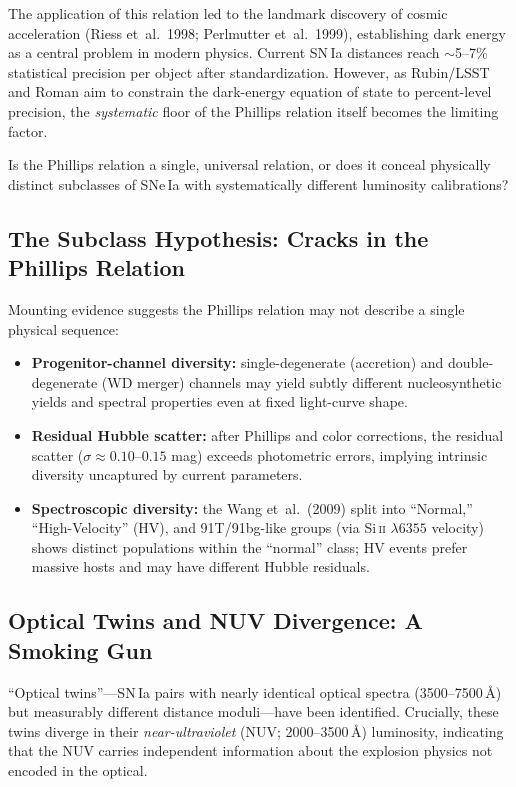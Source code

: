 \documentclass[11pt]{article}
\begin{document}
The application of this relation led to the landmark discovery of cosmic acceleration (Riess
et~al.\ 1998; Perlmutter et~al.\ 1999), establishing dark energy as a central problem in modern
physics. Current SN\,Ia distances reach $\sim$5--7\% statistical precision per object after
standardization. However, as Rubin/LSST and Roman aim to constrain the dark-energy equation of
state to percent-level precision, the \emph{systematic} floor of the Phillips relation itself
becomes the limiting factor.

\begin{keybox}
Is the Phillips relation a single, universal relation, or does it conceal physically distinct
subclasses of SNe\,Ia with systematically different luminosity calibrations?
\end{keybox}

\subsection{The Subclass Hypothesis: Cracks in the Phillips Relation}
Mounting evidence suggests the Phillips relation may not describe a single physical sequence:
\begin{itemize}
\item \textbf{Progenitor-channel diversity:} single-degenerate (accretion) and double-degenerate
(WD merger) channels may yield subtly different nucleosynthetic yields and spectral properties even
at fixed light-curve shape.
\item \textbf{Residual Hubble scatter:} after Phillips and color corrections, the residual
scatter ($\sigma\approx0.10$--$0.15$ mag) exceeds photometric errors, implying intrinsic diversity
uncaptured by current parameters.
\item \textbf{Spectroscopic diversity:} the Wang et~al.\ (2009) split into ``Normal,''
``High-Velocity'' (HV), and 91T/91bg-like groups (via Si\,\textsc{ii} $\lambda6355$ velocity) shows
distinct populations within the ``normal'' class; HV events prefer massive hosts and may have
different Hubble residuals.
\end{itemize}

\subsection{Optical Twins and NUV Divergence: A Smoking Gun}
\begin{keybox}
``Optical twins''---SN\,Ia pairs with nearly identical optical spectra (3500--7500\,\AA) but
measurably different distance moduli---have been identified. Crucially, these twins diverge in their
\emph{near-ultraviolet} (NUV; 2000--3500\,\AA) luminosity, indicating that the NUV carries
independent information about the explosion physics not encoded in the optical.
\end{keybox}
\end{document}
